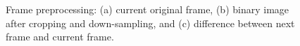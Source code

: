 \documentclass[a4paper, 11pt]{article}
\begin{document}
 \begin{figure}[!htb]
  \begin{center}
    \caption{Frame preprocessing: (a) current original frame, (b) binary image after cropping and down-sampling, and (c) difference between next frame and current frame.}
    \label{fig:Preprocessing}
  \end{center}
\end{figure}
\end{document}
